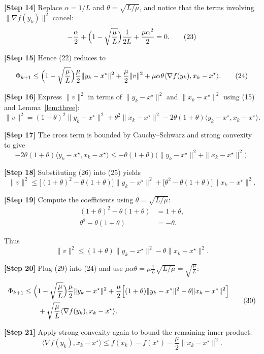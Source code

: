 \documentclass{article}
\newcommand{\grad}{\nabla}
\begin{document}
\noindent\textbf{[Step 14]}  Replace $\alpha=1/L$ and $\theta=\sqrt{L/\mu}$, and notice that the terms involving $\|\grad f(y_k)\|^2$ cancel:
\[
-\frac{\alpha}{2}+\Bigl(1-\sqrt{\frac{\mu}{L}}\Bigr)\frac{1}{2L}
+\frac{\mu\alpha^{2}}{2}
=0 .
\tag{23}
\]

\noindent\textbf{[Step 15]}  Hence (22) reduces to
\[
\Phi_{k+1}\le
\Bigl(1-\sqrt{\frac{\mu}{L}}\Bigr)\frac{\mu}{2}\|y_k-x^\star\|^2
+\frac{\mu}{2}\|v\|^2
+\mu\alpha\theta\langle\grad f(y_k),x_k-x^\star\rangle .
\tag{24}
\]

\noindent\textbf{[Step 16]}  Express $\|v\|^2$ in terms of $\|y_k-x^\star\|^2$ and $\|x_k-x^\star\|^2$ using (15) and Lemma~\ref{lem:three}:
\[
\|v\|^2=(1+\theta)^2\|y_k-x^\star\|^2
        +\theta^2\|x_k-x^\star\|^2
        -2\theta(1+\theta)\langle y_k-x^\star,x_k-x^\star\rangle .
\tag{25}
\]

\noindent\textbf{[Step 17]}  The cross term is bounded by Cauchy–Schwarz and strong convexity to give
\[
-2\theta(1+\theta)\langle y_k-x^\star,x_k-x^\star\rangle
\le -\theta(1+\theta)\bigl(\|y_k-x^\star\|^2+\|x_k-x^\star\|^2\bigr).
\tag{26}
\]

\noindent\textbf{[Step 18]}  Substituting (26) into (25) yields
\[
\|v\|^2\le
\bigl[(1+\theta)^2-\theta(1+\theta)\bigr]\|y_k-x^\star\|^2
+\bigl[\theta^2-\theta(1+\theta)\bigr]\|x_k-x^\star\|^2 .
\tag{27}
\]

\noindent\textbf{[Step 19]}  Compute the coefficients using $\theta=\sqrt{L/\mu}$:
\[
\begin{aligned}
(1+\theta)^2-\theta(1+\theta)
&=1+\theta,\\
\theta^2-\theta(1+\theta)&=-\theta .
\end{aligned}
\tag{28}
\]

Thus
\[
\|v\|^2\le (1+\theta)\|y_k-x^\star\|^2-\theta\|x_k-x^\star\|^2 .
\tag{29}
\]

\noindent\textbf{[Step 20]}  Plug (29) into (24) and use $\mu\alpha\theta= \mu\frac{1}{L}\sqrt{L/\mu}= \sqrt{\frac{\mu}{L}}$:
\[
\begin{aligned}
\Phi_{k+1}
&\le \Bigl(1-\sqrt{\frac{\mu}{L}}\Bigr)\frac{\mu}{2}\|y_k-x^\star\|^2
   +\frac{\mu}{2}\Bigl[(1+\theta)\|y_k-x^\star\|^2-\theta\|x_k-x^\star\|^2\Bigr]  \\
&\qquad +\sqrt{\frac{\mu}{L}}\langle\grad f(y_k),x_k-x^\star\rangle .
\end{aligned}
\tag{30}
\]

\noindent\textbf{[Step 21]}  Apply strong convexity again to bound the remaining inner product:
\[
\langle\grad f(y_k),x_k-x^\star\rangle
\le f(x_k)-f(x^\star)-\frac{\mu}{2}\|x_k-x^\star\|^2 .
\tag{31}
\]
\end{document}
